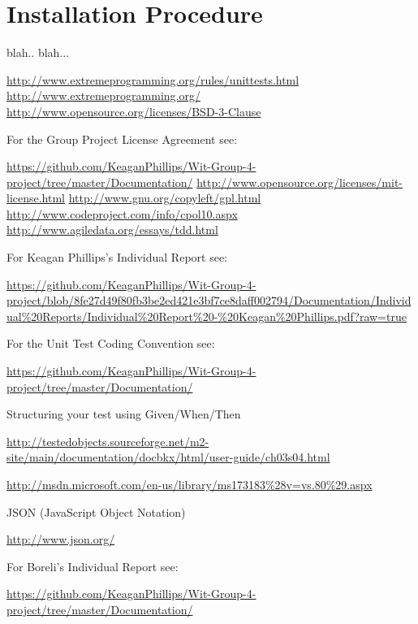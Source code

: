 \documentclass[a4paper,12pt]{article}
\begin{document}
\section{Installation Procedure}
blah.. blah...


\clearpage
\begin{thebibliography}{5}
 \url{http://www.extremeprogramming.org/rules/unittests.html}
 \url{http://www.extremeprogramming.org/}
 \url{http://www.opensource.org/licenses/BSD-3-Clause}
  \begin{flushleft}
For the Group Project License Agreement see: 
\end{flushleft} \url{https://github.com/KeaganPhillips/Wit-Group-4-project/tree/master/Documentation/}
 \url{http://www.opensource.org/licenses/mit-license.html}
 \url{http://www.gnu.org/copyleft/gpl.html}
 \url{http://www.codeproject.com/info/cpol10.aspx}
 \url{http://www.agiledata.org/essays/tdd.html}
 \begin{flushleft}
For Keagan Phillips's Individual Report see: 
\end{flushleft}\url{https://github.com/KeaganPhillips/Wit-Group-4-project/blob/8fe27d49f80fb3be2ed421e3bf7ce8daff002794/Documentation/Individual%20Reports/Individual%20Report%20-%20Keagan%20Phillips.pdf?raw=true}

 \begin{flushleft}
For the Unit Test Coding Convention see:
\end{flushleft} \url{https://github.com/KeaganPhillips/Wit-Group-4-project/tree/master/Documentation/}

 \begin{flushleft}
Structuring your test using Given/When/Then
\end{flushleft} \url{http://testedobjects.sourceforge.net/m2-site/main/documentation/docbkx/html/user-guide/ch03s04.html}

 \url{http://msdn.microsoft.com/en-us/library/ms173183%28v=vs.80%29.aspx}


 \begin{flushleft}
JSON (JavaScript Object Notation)
\end{flushleft} \url{http://www.json.org/}

 \begin{flushleft}
For Boreli's Individual Report see:   
\end{flushleft} \url{https://github.com/KeaganPhillips/Wit-Group-4-project/tree/master/Documentation/}


\end{thebibliography}
\end{document}
